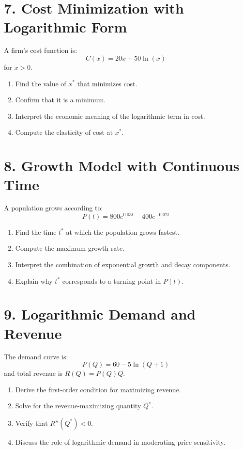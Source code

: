 \documentclass[12pt]{article}
\begin{document}
\section*{7. Cost Minimization with Logarithmic Form}

A firm’s cost function is:
\[
C(x) = 20x + 50\ln(x)
\]
for \(x>0\).

\begin{enumerate}
\item Find the value of \(x^*\) that minimizes cost.
\item Confirm that it is a minimum.
\item Interpret the economic meaning of the logarithmic term in cost.
\item Compute the elasticity of cost at \(x^*\).
\end{enumerate}



\section*{8. Growth Model with Continuous Time}

A population grows according to:
\[
P(t) = 800e^{0.03t} - 400e^{-0.02t}
\]

\begin{enumerate}
\item Find the time \(t^*\) at which the population grows fastest.
\item Compute the maximum growth rate.
\item Interpret the combination of exponential growth and decay components.
\item Explain why \(t^*\) corresponds to a turning point in \(P(t)\).
\end{enumerate}



\section*{9. Logarithmic Demand and Revenue}

The demand curve is:
\[
P(Q) = 60 - 5\ln(Q + 1)
\]
and total revenue is \(R(Q) = P(Q)Q\).

\begin{enumerate}
\item Derive the first-order condition for maximizing revenue.
\item Solve for the revenue-maximizing quantity \(Q^*\).
\item Verify that \(R''(Q^*) < 0\).
\item Discuss the role of logarithmic demand in moderating price sensitivity.
\end{enumerate}
\end{document}
